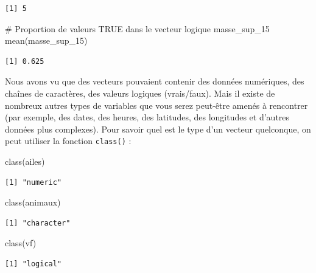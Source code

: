 \documentclass[
  a4paper,
  DIV=11,
  numbers=noendperiod,
  oneside]{scrreprt}
\newenvironment{Shaded}{}{}
\newcommand{\CommentTok}[1]{\textcolor[rgb]{0.42,0.45,0.49}{#1}}
\newcommand{\FunctionTok}[1]{\textcolor[rgb]{0.44,0.26,0.76}{#1}}
\newcommand{\NormalTok}[1]{\textcolor[rgb]{0.14,0.16,0.18}{#1}}
\begin{document}
\begin{verbatim}
[1] 5
\end{verbatim}

\begin{Shaded}
\begin{Highlighting}[]
\CommentTok{\# Proportion de valeurs TRUE dans le vecteur logique masse\_sup\_15}
\FunctionTok{mean}\NormalTok{(masse\_sup\_15)}
\end{Highlighting}
\end{Shaded}

\begin{verbatim}
[1] 0.625
\end{verbatim}

Nous avons vu que des vecteurs pouvaient contenir des données
numériques, des chaînes de caractères, des valeurs logiques
(vrais/faux). Mais il existe de nombreux autres types de variables que
vous serez peut-être amenés à rencontrer (par exemple, des dates, des
heures, des latitudes, des longitudes et d'autres données plus
complexes). Pour savoir quel est le type d'un vecteur quelconque, on
peut utiliser la fonction \texttt{class()} :

\begin{Shaded}
\begin{Highlighting}[]
\FunctionTok{class}\NormalTok{(ailes)}
\end{Highlighting}
\end{Shaded}

\begin{verbatim}
[1] "numeric"
\end{verbatim}

\begin{Shaded}
\begin{Highlighting}[]
\FunctionTok{class}\NormalTok{(animaux)}
\end{Highlighting}
\end{Shaded}

\begin{verbatim}
[1] "character"
\end{verbatim}

\begin{Shaded}
\begin{Highlighting}[]
\FunctionTok{class}\NormalTok{(vf)}
\end{Highlighting}
\end{Shaded}

\begin{verbatim}
[1] "logical"
\end{verbatim}
\end{document}
